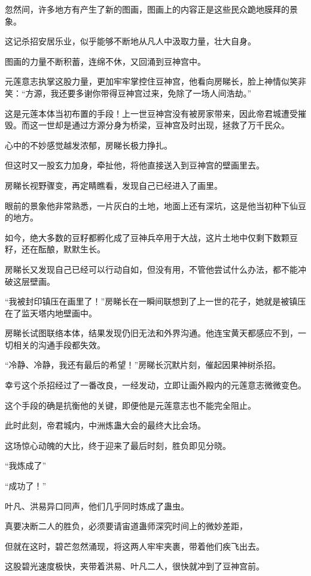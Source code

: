 \begin{this_body}
忽然间，许多地方有产生了新的图画，图画上的内容正是这些民众跪地膜拜的景象。

这记杀招安居乐业，似乎能够不断地从凡人中汲取力量，壮大自身。

图画的力量不断积蓄，连绵不休，又回涌到豆神宫中。

元莲意志执掌这股力量，更加牢牢掌控住豆神宫，他看向房睇长，脸上神情似笑非笑：“方源，我还要多谢你带得豆神宫过来，免除了一场人间浩劫。”

这是元莲本体当初布置的手段！上一世豆神宫没有被房家带来，因此帝君城遭受摧毁。而这一世却是通过方源分身为桥梁，豆神宫及时出现，拯救了万千民众。

心中的不妙感觉越发浓郁，房睇长极力挣扎。

但这时又一股玄力加身，牵扯他，将他直接送入到豆神宫的壁画里去。

房睇长视野骤变，再定睛瞧看，发现自己已经进入了画里。

眼前的景象他非常熟悉，一片灰白的土地，地面上还有深坑，这是他当初种下仙豆的地方。

如今，绝大多数的豆籽都孵化成了豆神兵卒用于大战，这片土地中仅剩下数颗豆籽，还在酝酿，默默生长。

房睇长又发现自己已经可以行动自如，但没有用，不管他尝试什么办法，都不能冲破这层壁画。

“我被封印镇压在画里了！”房睇长在一瞬间联想到了上一世的花子，她就是被镇压在了监天塔内地壁画中。

房睇长试图联络本体，结果发现仍旧无法和外界沟通。他连宝黄天都感应不到，一切相关的沟通手段都失效。

“冷静、冷静，我还有最后的希望！”房睇长沉默片刻，催起因果神树杀招。

幸亏这个杀招经过了一番改良，一经发动，立即让画外殿内的元莲意志微微变色。

这个手段的确是抗衡他的关键，即便他是元莲意志也不能完全阻止。

此时此刻，帝君城内，中洲炼蛊大会的最终大比会场。

这场惊心动魄的大比，终于迎来了最后时刻，胜负即见分晓。

“我炼成了”

“成功了！”

叶凡、洪易异口同声，他们几乎同时炼成了蛊虫。

真要决断二人的胜负，必须要请宙道蛊师深究时间上的微妙差距，

但就在这时，碧芒忽然涌现，将这两人牢牢夹裹，带着他们疾飞出去。

这股碧光速度极快，夹带着洪易、叶凡二人，很快就冲到了豆神宫前。


\end{this_body}

